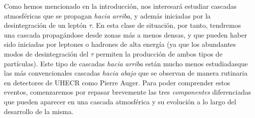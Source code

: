 \documentclass[11 pt, a4paper]{article} %
\numberwithin{equation}{section}
\numberwithin{figure}{section}
\numberwithin{table}{section}
\begin{document}
Como hemos mencionado en la introducción, nos interesará estudiar cascadas atmosféricas que se propagan \textit{hacia arriba}, y además iniciadas por la desintegración de un leptón $\tau$. En esta clase de situación, por tanto, tendremos una cascada propagándose desde zonas más a menos densas, y que pueden haber sido iniciadas por leptones o hadrones de alta energía (ya que los abundantes modos de desintegración del $\tau$ permiten la producción de ambos tipos de partículas). Este tipo de cascadas \textit{hacia arriba} están mucho menos estudiadasque las más convencionales cascadas \textit{hacia abajo} que se observan de manera rutinaria en detectores de UHECR como Pierre Auger. Para poder comprender estos eventos, comenzaremos por repasar brevemente las tres \textit{componentes} diferenciadas que pueden aparecer en una cascada atmosférica y su evolución a lo largo del desarrollo de la misma.
\end{document}

